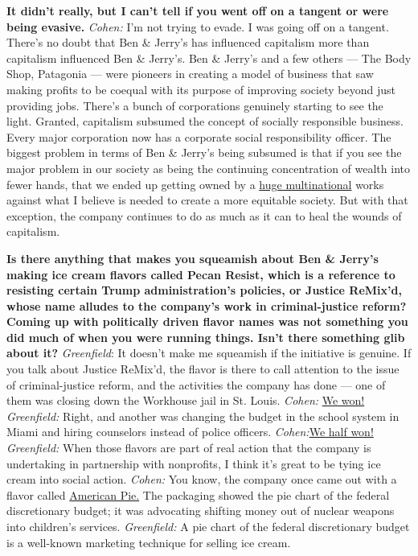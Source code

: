 \textbf{It didn't really, but I can't tell if you went off on a tangent
or were being evasive.} \emph{Cohen:} I'm not trying to evade. I was
going off on a tangent. There's no doubt that Ben \& Jerry's has
influenced capitalism more than capitalism influenced Ben \& Jerry's.
Ben \& Jerry's and a few others --- The Body Shop, Patagonia --- were
pioneers in creating a model of business that saw making profits to be
coequal with its purpose of improving society beyond just providing
jobs. There's a bunch of corporations genuinely starting to see the
light. Granted, capitalism subsumed the concept of socially responsible
business. Every major corporation now has a corporate social
responsibility officer. The biggest problem in terms of Ben \& Jerry's
being subsumed is that if you see the major problem in our society as
being the continuing concentration of wealth into fewer hands, that we
ended up getting owned by a
\href{http://nytimes3xbfgragh.onion\#tooltip-2}{huge multinational}
works against what I believe is needed to create a more equitable
society. But with that exception, the company continues to do as much as
it can to heal the wounds of capitalism.

\textbf{Is there anything that makes you squeamish about Ben \& Jerry's
making ice cream flavors called Pecan Resist, which is a reference to
resisting certain Trump administration's policies, or Justice ReMix'd,
whose name alludes to the company's work in criminal-justice reform?
Coming up with politically driven flavor names was not something you did
much of when you were running things. Isn't there something glib about
it?} \emph{Greenfield}: It doesn't make me squeamish if the initiative
is genuine. If you talk about Justice ReMix'd, the flavor is there to
call attention to the issue of criminal-justice reform, and the
activities the company has done --- one of them was closing down the
Workhouse jail in St. Louis. \emph{Cohen:}
\href{http://nytimes3xbfgragh.onion\#tooltip-3}{We won!}
\emph{Greenfield:} Right, and another was changing the budget in the
school system in Miami and hiring counselors instead of police officers.
\emph{Cohen:}\href{http://nytimes3xbfgragh.onion\#tooltip-4}{We half
won!} \emph{Greenfield:} When those flavors are part of real action that
the company is undertaking in partnership with nonprofits, I think it's
great to be tying ice cream into social action. \emph{Cohen:} You know,
the company once came out with a flavor called
\href{http://nytimes3xbfgragh.onion\#tooltip-5}{American Pie.} The
packaging showed the pie chart of the federal discretionary budget; it
was advocating shifting money out of nuclear weapons into children's
services. \emph{Greenfield:} A pie chart of the federal discretionary
budget is a well-known marketing technique for selling ice cream.

